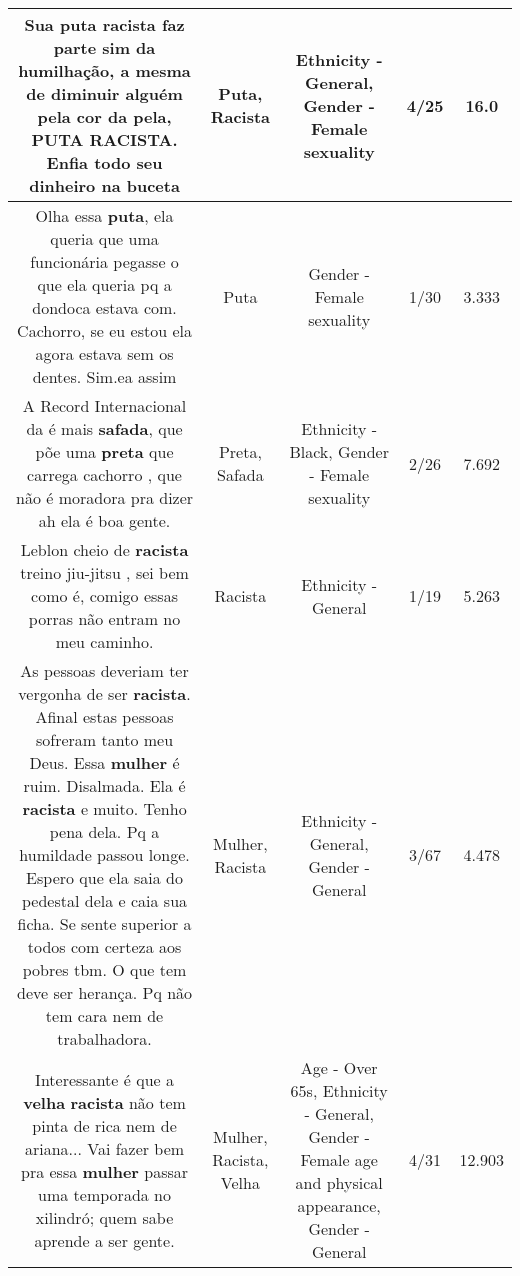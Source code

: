 \documentclass[11pt]{article}
\newlength\mylength
\begin{document}
\begin{center}
\begin{longtable}{|C{.65\mylength}|C{.30\mylength}|C{.12\mylength}|C{.12\mylength}|C{.12\mylength}|}
  \small Sua \textbf{puta} \textbf{racista} faz parte sim da humilhação, a mesma de diminuir alguém pela cor da pela, \textbf{PUTA} \textbf{RACISTA}. Enfia todo seu dinheiro na buceta\normalsize   & Puta, Racista & Ethnicity - General, Gender - Female sexuality & 4/25 & 16.0 \\  \hline
  \small Olha essa \textbf{puta}, ela queria que uma funcionária pegasse o que ela queria pq a dondoca estava com. Cachorro, se eu estou ela agora estava sem os dentes. Sim.ea assim\normalsize   & Puta & Gender - Female sexuality & 1/30 & 3.333 \\  \hline
  \small A Record Internacional da é mais \textbf{safada}, que põe uma \textbf{preta} que carrega cachorro , que não é moradora pra dizer ah ela é boa gente.\normalsize   & Preta, Safada & Ethnicity - Black, Gender - Female sexuality & 2/26 & 7.692 \\  \hline
  \small Leblon cheio de \textbf{racista} treino jiu-jitsu , sei bem como é, comigo essas porras não entram no meu caminho.\normalsize   & Racista & Ethnicity - General & 1/19 & 5.263 \\  \hline
  \small As pessoas deveriam  ter vergonha de ser \textbf{racista}.  Afinal estas pessoas sofreram tanto meu Deus. Essa \textbf{mulher} é ruim. Disalmada. Ela é \textbf{racista} e muito. Tenho pena dela. Pq a humildade passou longe. Espero que ela saia do pedestal dela e caia sua ficha. Se sente superior a todos com certeza aos pobres tbm. O que tem deve ser herança.  Pq não tem cara nem de trabalhadora.\normalsize   & Mulher, Racista & Ethnicity - General, Gender - General & 3/67 & 4.478 \\  \hline
  \small Interessante é que a \textbf{v\textbf{elha}} \textbf{racista} não tem pinta de rica nem de ariana...  Vai fazer bem pra essa \textbf{mulher} passar uma temporada no xilindró; quem sabe aprende a ser gente.\normalsize   & Mulher, Racista, Velha & Age - Over 65s, Ethnicity - General, Gender - Female age and physical appearance, Gender - General & 4/31 & 12.903 \\  \hline

\end{longtable}
\end{center}
\end{document}
